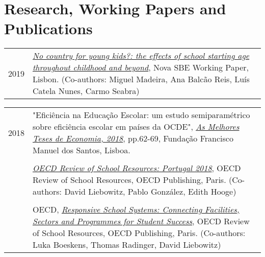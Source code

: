\documentclass[a4paper,11pt]{article} %
\begin{document}
\section[Research, Working Papers and Publications]{\faBook \hspace{3pt} Research, Working Papers and Publications}

\begin{tabular}{r|p{13cm}}
	2019 &  \href{https://glima93.github.io/papers/WKP_AGE.pdf}{\textit{No country for young kids?: the effects of school starting age throughout childhood and beyond}}, Nova SBE Working Paper, Lisbon. (Co-authors: Miguel Madeira, Ana Balcão Reis, Luís Catela Nunes, Carmo Seabra) \\
\end{tabular}

\begin{tabular}{r|p{13cm}}
	2018 &  "Eficiência na Educação Escolar: um estudo semiparamétrico sobre eficiência escolar em países da OCDE", \href{https://www.ffms.pt/FileDownload/d6e1656d-9dde-45e9-871f-0feb67c7d7f8/as-melhores-teses-de-economia-2018}{{\textit{As Melhores Teses de Economia, 2018}}}, pp.62-69, Fundação Francisco Manuel dos Santos, Lisboa.  \\
	& \\
	& \href{http://www.oecd.org/portugal/oecd-reviews-of-school-resources-portugal-2018-9789264308411-en.htm}{\textit{OECD Review of School Resources: Portugal 2018}}, OECD Review of School Resources, OECD Publishing, Paris. (Co-authors: David Liebowitz, Pablo González, Edith Hooge)\\
	& \\
	& OECD,  \href{http://www.oecd.org/publications/responsive-school-systems-9789264306707-en.htm}{\textit{Responsive School Systems: Connecting Facilities, Sectors and Programmes for Student Success}}, OECD Review of School Resources, OECD Publishing, Paris. (Co-authors: Luka Boeskens, Thomas Radinger, David Liebowitz) \\
\end{tabular}
\end{document}
